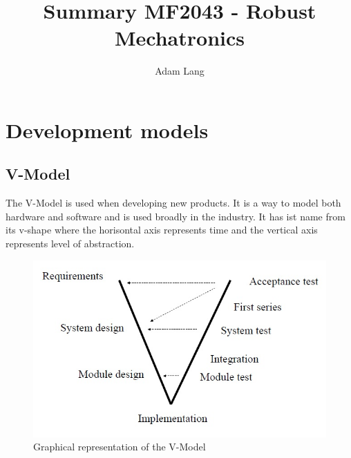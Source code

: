 \documentclass[12pt,a4paper]{article}
\title{Summary MF2043 - Robust Mechatronics}
\author{Adam Lang}
\begin{document}
\maketitle
\section{Development models}
  \subsection{V-Model}

The V-Model is used when developing new products. It is a way to model
both hardware and software and is used broadly in the industry.
It has ist name from its v-shape where the horisontal axis represents
time and the vertical axis represents level of abstraction. 

\begin{figure}[!h]
  \centering
  \includegraphics[scale=0.5]{VModel} 
  \caption{Graphical representation of the V-Model}
  \label{fig:Vmodel}
\end{figure}
\end{document}
